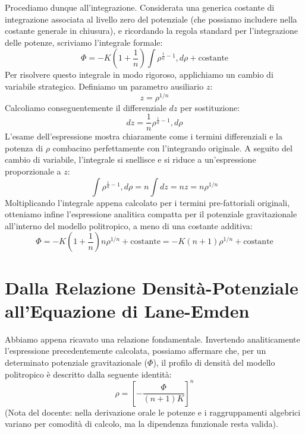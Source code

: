 Procediamo dunque all'integrazione. Considerata una generica costante di integrazione associata al livello zero del potenziale (che possiamo includere nella costante generale in chiusura), e ricordando la regola standard per l'integrazione delle potenze, scriviamo l'integrale formale:
\begin{equation}
\Phi = - K \left( 1 + \frac{1}{n} \right) \int \rho^{\frac{1}{n} - 1} , d\rho + \text{costante}
\end{equation}
Per risolvere questo integrale in modo rigoroso, applichiamo un cambio di variabile strategico. Definiamo un parametro ausiliario $z$:
\begin{equation}
z = \rho^{1/n}
\end{equation}
Calcoliamo conseguentemente il differenziale $dz$ per sostituzione:
\begin{equation}
dz = \frac{1}{n} \rho^{\frac{1}{n} - 1} , d\rho
\end{equation}
L'esame dell'espressione mostra chiaramente come i termini differenziali e la potenza di $\rho$ combacino perfettamente con l'integrando originale. A seguito del cambio di variabile, l'integrale si snellisce e si riduce a un'espressione proporzionale a $z$:
\begin{equation}
\int \rho^{\frac{1}{n} - 1} , d\rho = n \int dz = n z = n \rho^{1/n}
\end{equation}
Moltiplicando l'integrale appena calcolato per i termini pre-fattoriali originali, otteniamo infine l'espressione analitica compatta per il potenziale gravitazionale all'interno del modello politropico, a meno di una costante additiva:
\begin{equation}
\Phi = - K \left( 1 + \frac{1}{n} \right) n \rho^{1/n} + \text{costante} = - K (n + 1) \rho^{1/n} + \text{costante}
\end{equation}

\section{Dalla Relazione Densità-Potenziale all'Equazione di Lane-Emden}

Abbiamo appena ricavato una relazione fondamentale. Invertendo analiticamente l'espressione precedentemente calcolata, possiamo affermare che, per un determinato potenziale gravitazionale ($\Phi$), il profilo di densità del modello politropico è descritto dalla seguente identità:
\begin{equation}
\rho = \left[ - \frac{\Phi}{(n+1) K} \right]^n
\end{equation}
(Nota del docente: nella derivazione orale le potenze e i raggruppamenti algebrici variano per comodità di calcolo, ma la dipendenza funzionale resta valida).

